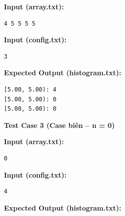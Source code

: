 \textbf{Input (array.txt):}
\begin{lstlisting}
4 5 5 5 5
\end{lstlisting}

\textbf{Input (config.txt):}
\begin{lstlisting}
3
\end{lstlisting}

\textbf{Expected Output (histogram.txt):}
\begin{lstlisting}
[5.00, 5.00): 4
[5.00, 5.00): 0
[5.00, 5.00): 0
\end{lstlisting}

\vspace{0.5cm}

\textbf{Test Case 3 (Case biên -- n = 0)}

\textbf{Input (array.txt):}
\begin{lstlisting}
0
\end{lstlisting}

\textbf{Input (config.txt):}
\begin{lstlisting}
4
\end{lstlisting}

\textbf{Expected Output (histogram.txt):}
\begin{lstlisting}
\end{lstlisting}